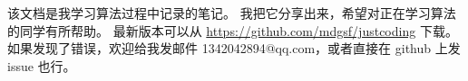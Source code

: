 该文档是我学习算法过程中记录的笔记。
我把它分享出来，希望对正在学习算法的同学有所帮助。
最新版本可以从 \href{https://github.com/mdgsf/justcoding}{https://github.com/mdgsf/justcoding} 下载。
如果发现了错误，欢迎给我发邮件 1342042894@qq.com，或者直接在 github 上发 issue 也行。
